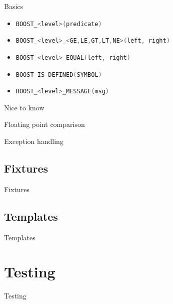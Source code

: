 \documentclass{beamer}
\newcommand{\sectiontitle}[1]{
    \section{#1}
    \begin{frame}
        \centering
        \Huge{#1}
    \end{frame}
}
\newcommand{\inlinecpp}[1]{
    \lstinline[language=C++]{#1}
}
\begin{document}
        \begin{frame}{Basics}
            \begin{itemize}
                \item  \inlinecpp{BOOST_<level>(predicate)}
                \item  \inlinecpp{BOOST_<level>_<GE,LE,GT,LT,NE>(left, right)}
                \item  \inlinecpp{BOOST_<level>_EQUAL(left, right)}
                \item  \inlinecpp{BOOST_IS_DEFINED(SYMBOL)}
                \item  \inlinecpp{BOOST_<level>_MESSAGE(msg)}
            \end{itemize}
        \end{frame}

        \begin{frame}{Nice to know}
            
        \end{frame}

        \begin{frame}{Floating point comparison}
            
        \end{frame}

        \begin{frame}{Exception handling}
                  
        \end{frame}

        \subsection{Fixtures}
        \begin{frame}[plain]{Fixtures}
            
        \end{frame}

        \subsection{Templates}
        \begin{frame}[plain]{Templates}
            
        \end{frame}

    \sectiontitle{Testing}
\end{document}
